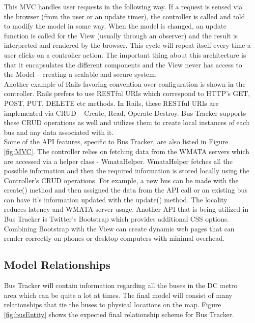 \documentclass[12pt]{article}
\begin{document}
This MVC handles user requests in the following way.  If a request is sensed via the browser (from the user or an update timer), the controller is called and told to modify the model in some way.  When the model is changed, an update function is called for the View (usually through an observer) and the result is interpreted and rendered by the browser.  This cycle will repeat itself every time a user clicks on a controller action.  The important thing about this architecture is that it encapsulates the different components and the View never has access to the Model -- creating a scalable and secure system.\\

Another example of Rails favoring convention over configuration is shown in the controller.  Rails prefers to use RESTful URIs which correspond to HTTP's GET, POST, PUT, DELETE etc methods.  In Rails, these RESTful URIs are implemented via CRUD -- Create, Read, Operate Destroy.  Bus Tracker supports these CRUD operations as well and utilizes them to create local instances of each bus and any data associated with it.\\

Some of the API features, specific to Bus Tracker, are also listed in Figure \ref{fig:MVC}.  The controller relies on fetching data from the WMATA servers which  are accessed via a helper class - WmataHelper.  WmataHelper fetches all the possible information and then the required information is stored locally using the Controller's CRUD operations.  For example, a new bus can be made with the create() method and then assigned the data from the API call or an existing bus can have it's information updated with the update() method.  The locality reduces latency and WMATA server usage.  Another API that is being utilized in Bus Tracker is Twitter's Bootstrap which provides additional CSS options. Combining Bootstrap with the View can create dynamic web pages that can render correctly on phones or desktop computers with minimal overhead.

\subsection*{Model Relationships}

Bus Tracker will contain information regarding all the buses in the DC metro area which can be quite a lot at times.  The final model will consist of many relationships that tie the buses to physical locations on the map.  Figure \ref{fig:busEntity} shows the expected final relationship scheme for Bus Tracker.
\end{document}
